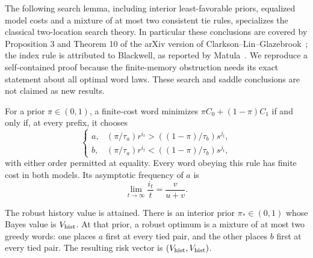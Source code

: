 The following search lemma, including interior least-favorable priors,
equalized model costs and a mixture of at most two consistent tie
rules, specializes the classical two-location search theory.  In
particular these conclusions are covered by Proposition 3 and
Theorem 10 of the arXiv version of
Clarkson--Lin--Glazebrook~\cite{ClarksonLinGlazebrook2023}; the
index rule is attributed to Blackwell, as reported by
Matula~\cite{Matula1964}.  We reproduce
a self-contained proof because the finite-memory obstruction
needs its exact statement about all optimal word laws.  These
search and saddle conclusions are not claimed as new results.

\begin{lemma}
\label{lem:r80-search-saddle}
For a prior $\pi\in(0,1)$, a finite-cost word minimizes
$\pi C_0+(1-\pi)C_1$ if and only if, at every prefix, it chooses
\begin{equation}\label{eq:r80-greedy-rule}
 \begin{cases}
 a,&(\pi/\tau_a)r^{i_t}>((1-\pi)/\tau_b)s^{j_t},\\
 b,&(\pi/\tau_a)r^{i_t}<((1-\pi)/\tau_b)s^{j_t},
 \end{cases}
\end{equation}
with either order permitted at equality.  Every word obeying this
rule has finite cost in both models.  Its asymptotic frequency of
$a$ is
\begin{equation}\label{eq:r80-greedy-frequency}
 \lim_{t\to\infty}\frac{i_t}{t}=\frac{v}{u+v}.
\end{equation}

The robust history value is attained.  There is an interior prior
$\pi_*\in(0,1)$ whose Bayes value is $V_{\rm hist}$.  At that prior,
a robust optimum is a mixture of at most two greedy words: one
places $a$ first at every tied pair, and the other places $b$ first
at every tied pair.  The resulting risk vector is
$(V_{\rm hist},V_{\rm hist})$.
\end{lemma}
